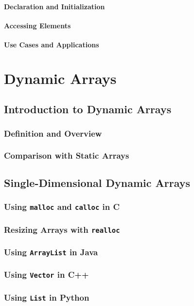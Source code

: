 \documentclass[12pt, oneside]{book}
\begin{document}
	\subsubsection{Declaration and Initialization}
	\subsubsection{Accessing Elements}
	\subsubsection{Use Cases and Applications}
	\chapter{Dynamic Arrays}
	\section{Introduction to Dynamic Arrays}
	\subsection{Definition and Overview}
	\subsection{Comparison with Static Arrays}
	
	\section{Single-Dimensional Dynamic Arrays}
	\subsection{Using \texttt{malloc} and \texttt{calloc} in C}
	\subsection{Resizing Arrays with \texttt{realloc}}
	\subsection{Using \texttt{ArrayList} in Java}
	\subsection{Using \texttt{Vector} in C++}
	\subsection{Using \texttt{List} in Python}
	
\end{document}
